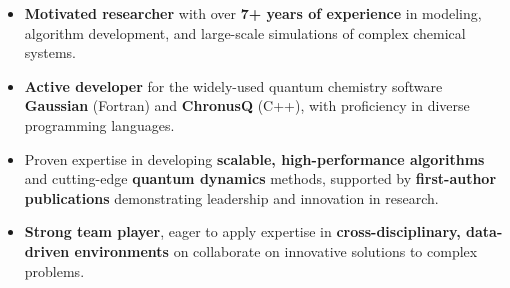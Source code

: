 

\begin{itemize}[label=$\bullet$] 

    \item\textbf{Motivated researcher} with over \textbf{7+ years of experience} in modeling, algorithm development, and large-scale simulations of complex chemical systems.

    \item \textbf{Active developer} for the widely-used quantum chemistry software \textbf{Gaussian} (Fortran) and \textbf{ChronusQ} (C++), with proficiency in diverse programming languages.
    
    \item Proven expertise in developing \textbf{scalable, high-performance algorithms} and cutting-edge \textbf{quantum dynamics} methods, supported by \textbf{first-author publications} demonstrating leadership and innovation in research.
    
    \item \textbf{Strong team player}, eager to apply expertise in \textbf{cross-disciplinary, data-driven environments} on collaborate on innovative solutions to complex problems.

\end{itemize}